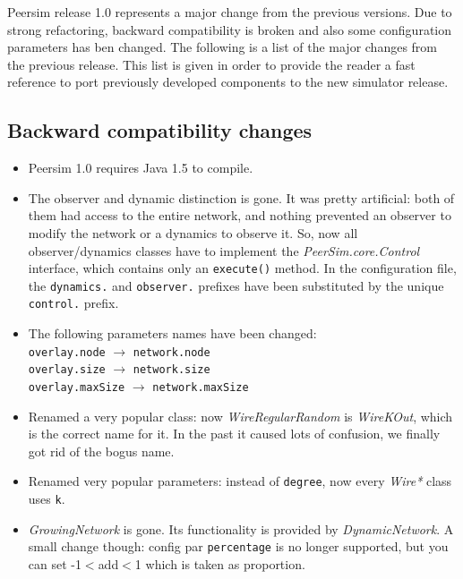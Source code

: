 \documentclass[a4paper,11pt]{article}
\begin{document}
Peersim release 1.0 represents a major change from the previous
versions. 
Due to strong refactoring, backward compatibility is broken and also
some configuration parameters has ben changed. 
The following is a list of the major changes from the previous
release. This list is given in order to provide the reader a fast reference to
port previously developed components to the new simulator release.

\subsection{Backward compatibility changes}
\label{s:comp_change}

\begin{itemize}

\item Peersim 1.0 requires Java 1.5 to compile.

\item The observer and dynamic distinction is gone. It was pretty artificial:
  both of them had access to the entire network, and nothing prevented
  an observer to modify the network or a dynamics to observe it. So,
  now all observer/dynamics classes have to implement the 
  \emph{PeerSim.core.Control} interface, which contains only an
  \texttt{execute()} 
  method. In the configuration file, the \texttt{dynamics.} and
  \texttt{observer.} 
  prefixes have been substituted by the unique \texttt{control.} prefix. 

\item The following parameters names have been changed:\\
  \texttt{overlay.node} $\to$ \texttt{network.node}\\
  \texttt{overlay.size} $\to$ \texttt{network.size}\\
  \texttt{overlay.maxSize} $\to$ \texttt{network.maxSize}

\item Renamed a very popular class: now \emph{WireRegularRandom} is
  \emph{WireKOut}, which 
  is the correct name for it. In the past it caused lots of confusion, we
  finally got rid of the bogus name.

\item Renamed very popular parameters: instead of \texttt{degree}, now
  every \emph{Wire*}  
  class uses \texttt{k}.

\item \emph{GrowingNetwork} is gone. Its functionality is provided by 
  \emph{DynamicNetwork}. A small change though: config par
  \texttt{percentage} is no longer  
  supported, but you can set -1$<$add$<$1 which is taken as proportion.


\end{itemize}
\end{document}
